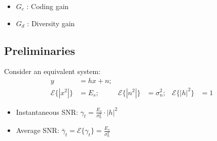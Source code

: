 \documentclass[a4paper, 10pt]{article}
\begin{document}
\hfill
\begin{minipage}[hbt]{5cm}
	\centering
		\begin{itemize}
			\item $G_c$ : Coding gain
			\item $G_d$ : Diversity gain
		\end{itemize}
\end{minipage}

\subsection{Preliminaries}
Consider an equivalent system:
\begin{align*}
	y &= hx +n;\\
	\mathcal{E}\{|x^2|\} &= E_s; & \mathcal{E}\{|n^2|\} &= \sigma_n^2; & \mathcal{E}\{|h|^2\} &= 1
\end{align*}
\begin{itemize}
	\item Instantaneous SNR: $\gamma_t = \frac{E_s}{\sigma_n^2}\cdot |h|^2$
\item Average SNR: $\bar{\gamma}_t = \mathcal{E}\{\gamma_t\} = \frac{E_s}{\sigma_n^2}$
\end{itemize}
\end{document}

